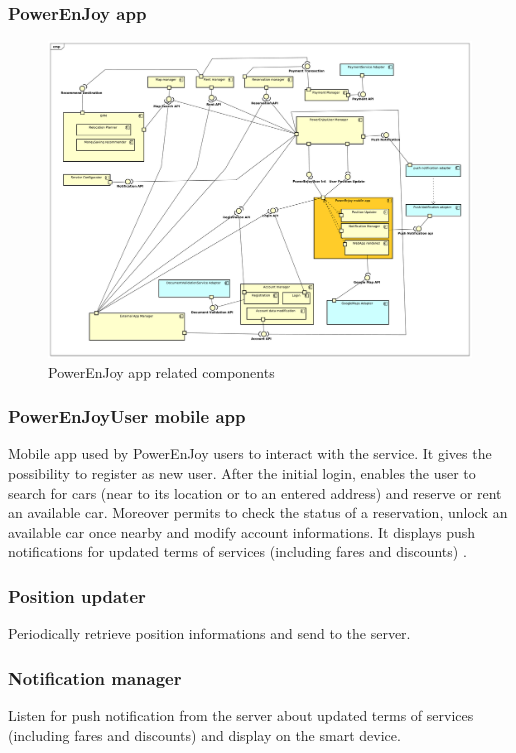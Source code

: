 \documentclass[english]{article}
\begin{document}
	
	
\subsubsection*{PowerEnJoy app}

	\begin{figure}[H]
		\centering
		\includegraphics[scale=0.24]{./ComponentDiagrams/PowerEnjoyuser.pdf}%
		\caption{PowerEnJoy app related components}
	\end{figure}
	
	\subsubsection{PowerEnJoyUser mobile app}
	Mobile app used by PowerEnJoy users to interact with the service. It gives the possibility to register as new user. After the initial login, enables the user to search for cars (near to its location or to an entered address) and reserve or rent an available car. Moreover permits to check the status of a reservation, unlock an available car once nearby and modify account informations. It displays push notifications for updated terms of services (including fares and discounts) .
		\subsubsection{Position updater}
		Periodically retrieve position informations and send to the server.
		\subsubsection{Notification manager}
		Listen for push notification from the server about updated terms of services (including fares and discounts) and display on the smart device.
\end{document}
